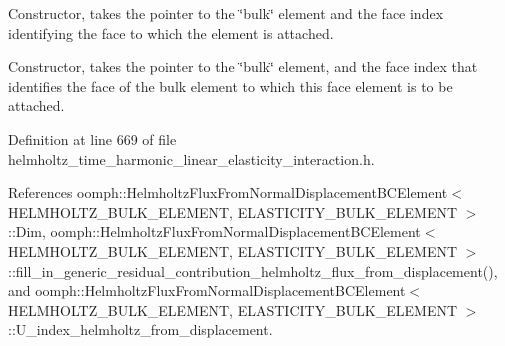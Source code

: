 Constructor, takes the pointer to the \char`\"{}bulk\char`\"{} element and the face index identifying the face to which the element is attached. 

Constructor, takes the pointer to the \char`\"{}bulk\char`\"{} element, and the face index that identifies the face of the bulk element to which this face element is to be attached. 

Definition at line 669 of file helmholtz\+\_\+time\+\_\+harmonic\+\_\+linear\+\_\+elasticity\+\_\+interaction.\+h.



References oomph\+::\+Helmholtz\+Flux\+From\+Normal\+Displacement\+B\+C\+Element$<$ H\+E\+L\+M\+H\+O\+L\+T\+Z\+\_\+\+B\+U\+L\+K\+\_\+\+E\+L\+E\+M\+E\+N\+T, E\+L\+A\+S\+T\+I\+C\+I\+T\+Y\+\_\+\+B\+U\+L\+K\+\_\+\+E\+L\+E\+M\+E\+N\+T $>$\+::\+Dim, oomph\+::\+Helmholtz\+Flux\+From\+Normal\+Displacement\+B\+C\+Element$<$ H\+E\+L\+M\+H\+O\+L\+T\+Z\+\_\+\+B\+U\+L\+K\+\_\+\+E\+L\+E\+M\+E\+N\+T, E\+L\+A\+S\+T\+I\+C\+I\+T\+Y\+\_\+\+B\+U\+L\+K\+\_\+\+E\+L\+E\+M\+E\+N\+T $>$\+::fill\+\_\+in\+\_\+generic\+\_\+residual\+\_\+contribution\+\_\+helmholtz\+\_\+flux\+\_\+from\+\_\+displacement(), and oomph\+::\+Helmholtz\+Flux\+From\+Normal\+Displacement\+B\+C\+Element$<$ H\+E\+L\+M\+H\+O\+L\+T\+Z\+\_\+\+B\+U\+L\+K\+\_\+\+E\+L\+E\+M\+E\+N\+T, E\+L\+A\+S\+T\+I\+C\+I\+T\+Y\+\_\+\+B\+U\+L\+K\+\_\+\+E\+L\+E\+M\+E\+N\+T $>$\+::\+U\+\_\+index\+\_\+helmholtz\+\_\+from\+\_\+displacement.

\mbox{\label{classoomph_1_1HelmholtzFluxFromNormalDisplacementBCElement_a5c093c485f9df81a14729f2ef41eced1}} 
